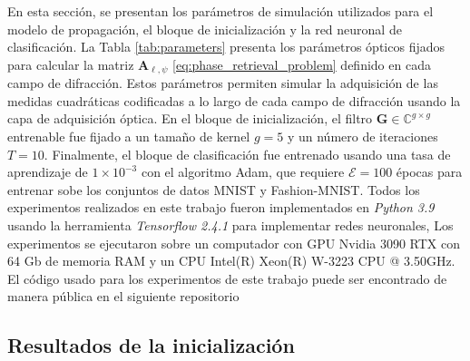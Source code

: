 En esta sección, se presentan los parámetros de simulación utilizados para el modelo de propagación, el bloque de inicialización y la red neuronal de clasificación. La Tabla \ref{tab:parameters} presenta los parámetros ópticos fijados para calcular la matriz $\mathbf{A}_{\ell,\psi}$ \eqref{eq:phase_retrieval_problem} definido en cada campo de difracción. Estos parámetros permiten simular la adquisición de las medidas cuadráticas codificadas a lo largo de cada campo de difracción usando la capa de adquisición óptica. En el bloque de inicialización, el filtro $\mathbf{G} \in \mathbb{C}^{g\times g}$ entrenable fue fijado a un tamaño de kernel $g=5$ y un número de iteraciones $T=10$. Finalmente, el bloque de clasificación fue entrenado usando una tasa de aprendizaje de $1\times 10^{-3}$ con el algoritmo Adam, que requiere $\mathcal{E}=100$ épocas para entrenar sobe los conjuntos de datos MNIST y Fashion-MNIST. Todos los experimentos realizados en este trabajo fueron implementados en \textit{Python 3.9} usando la herramienta \textit{Tensorflow 2.4.1}   para implementar redes neuronales, Los experimentos se ejecutaron sobre un computador con GPU Nvidia 3090 RTX con 64 Gb de memoria RAM y un CPU Intel(R) Xeon(R) W-3223 CPU @ 3.50GHz. El código usado para los experimentos de este trabajo puede ser encontrado de manera pública en el siguiente repositorio 

\begin{table}[!h]
\centering{}

\caption{ Parámetros de propagación usados para simular el modelo de propagación de la ecuación \eqref{eq:phase_retrieval_problem} para cada campo de difracción.}\label{tab:parameters}
\end{table}


\subsection{Resultados de la inicialización}



